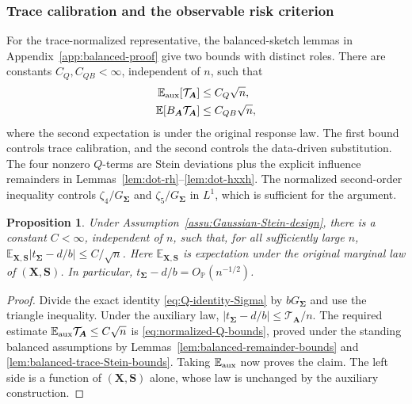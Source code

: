 \documentclass{article}
\theoremstyle{plain}
\newtheorem{proposition}[theorem]{Proposition}
\theoremstyle{definition}
\theoremstyle{definition}
\def\E{{\mathbb{E}}}
\def\P{{\mathbb{P}}}
\def\mathbold{\boldsymbol}
\def\cal{\mathcal}
\def\bA{\mathbold{A}}\def\calA{{\cal A}}\def\scrA{{\mathscr A}}\def\Ahat{\widehat{A}}\def\Atil{{\widetilde A}}
\def\bS{\mathbold{S}}\def\hbS{{\widehat{\bS}}}\def\tbS{{\widetilde{\bS}}}
\def\bX{\mathbold{X}}\def\hbX{{\widehat{\bX}}}\def\tbX{{\tilde{\bX}}}\def\bXbar{{\overline \bX}}
\def\bSigma{\mathbold{\Sigma}}\def\hbSigma{{\widehat{\bSigma}}}
\begin{document}
\subsubsection{Trace calibration and the observable risk criterion}
\label{app:proof-trace-calibration-general}

For the trace-normalized representative, the balanced-sketch lemmas in
Appendix~\ref{app:balanced-proof} give two bounds with distinct roles.
There are constants
$C_Q,C_{QB}<\infty$, independent of $n$, such that
\begin{align}
    \E_{\rm aux}[\mathcal T_{\bA}]&\leq C_Q\sqrt n,
    \label{eq:normalized-Q-bounds}\\
    \E[B_{\bA}\mathcal T_{\bA}]&\leq C_{QB}\sqrt n,
    \label{eq:weighted-Q-bounds}
\end{align}
where the second expectation is under the original response law. The first
bound controls trace calibration, and the second controls the data-driven
substitution. The four nonzero $Q$-terms are
Stein deviations plus the explicit influence remainders in
Lemmas~\ref{lem:dot-rh}--\ref{lem:dot-hxxh}. The normalized second-order inequality
controls $\zeta_4/G_{\bSigma}$ and $\zeta_5/G_{\bSigma}$ in $L^1$,
which is sufficient for the argument.

\begin{proposition}
\label{prop:trace-calibration-general}
Under Assumption~\ref{assu:Gaussian-Stein-design}, there is a constant
$C<\infty$, independent of $n$, such that, for all sufficiently large $n$,
$\E_{\bX,\bS}|t_{\bSigma}-d/b|\leq C/\sqrt n$.
Here $\E_{\bX,\bS}$ is expectation under the original marginal law of
$(\bX,\bS)$.  In particular,
$t_{\bSigma}-d/b=O_{\P}(n^{-1/2})$.
\end{proposition}

\begin{proof}
Divide the exact identity \eqref{eq:Q-identity-Sigma} by $bG_{\bSigma}$ and
use the triangle inequality.  Under the auxiliary law,
$|t_{\bSigma}-d/b|\leq \mathcal T_{\bA}/n$.
The required estimate
$\E_{\rm aux}\mathcal T_{\bA}\leq C\sqrt n$ is
\eqref{eq:normalized-Q-bounds}, proved under the standing balanced
assumptions by Lemmas~\ref{lem:balanced-remainder-bounds} and
\ref{lem:balanced-trace-Stein-bounds}.  Taking $\E_{\rm aux}$ now proves the
claim.  The left side is a function of $(\bX,\bS)$ alone, whose law is
unchanged by the auxiliary construction.
\end{proof}
\end{document}
